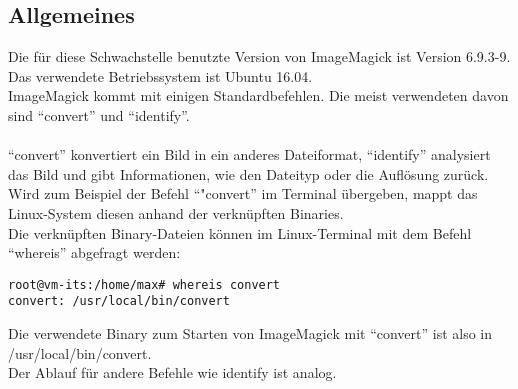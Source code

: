 \subsection{Allgemeines}\label{subsec:allgemeines}

Die für diese Schwachstelle benutzte Version von ImageMagick ist Version 6.9.3-9.\\
Das verwendete Betriebssystem ist Ubuntu 16.04.\\

ImageMagick kommt mit einigen Standardbefehlen.
Die meist verwendeten davon sind "`convert"' und "`identify"'.\\\\
"`convert"' konvertiert ein Bild in ein anderes Dateiformat, "`identify"' analysiert das Bild und gibt Informationen, wie den Dateityp oder die Auflösung zurück.\\

Wird zum Beispiel der Befehl "`"convert"' im Terminal übergeben, mappt das Linux-System diesen anhand der verknüpften Binaries.\\

Die verknüpften Binary-Dateien können im Linux-Terminal mit dem Befehl "`whereis"' abgefragt werden:

\begin{lstlisting}[language=Text, caption=whereis Binary Abfrage,label={lst:lstlisting}]
root@vm-its:/home/max# whereis convert
convert: /usr/local/bin/convert
\end{lstlisting}
\vspace{5mm}

Die verwendete Binary zum Starten von ImageMagick mit "`convert"' ist also in \\/usr/local/bin/convert.\\
Der Ablauf für andere Befehle wie identify ist analog.\\